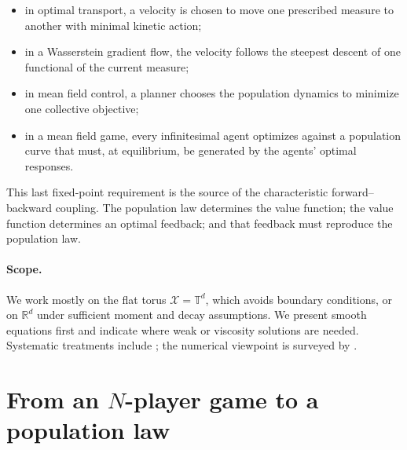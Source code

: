 \documentclass[11pt,a4paper]{article}
\theoremstyle{definition}
\newcommand{\RR}{\mathbb R}
\begin{document}
\begin{itemize}[leftmargin=2em]
  \item in optimal transport, a velocity is chosen to move one prescribed
  measure to another with minimal kinetic action;
  \item in a Wasserstein gradient flow, the velocity follows the steepest
  descent of one functional of the current measure;
  \item in mean field control, a planner chooses the population dynamics to
  minimize one collective objective;
  \item in a mean field game, every infinitesimal agent optimizes against a
  population curve that must, at equilibrium, be generated by the agents'
  optimal responses.
\end{itemize}

This last fixed-point requirement is the source of the characteristic
forward--backward coupling.  The population law determines the value function;
the value function determines an optimal feedback; and that feedback must
reproduce the population law.

\paragraph{Scope.}
We work mostly on the flat torus $\mathcal X=\mathbb T^d$, which avoids
boundary conditions, or on $\RR^d$ under sufficient moment and decay
assumptions.  We present smooth equations first and indicate where weak or
viscosity solutions are needed.  Systematic treatments include
\citet{CardaliaguetNotes2010,BensoussanFrehseYam2013,
CarmonaDelarue2018a,CarmonaDelarue2018b,CardaliaguetDelarueLasryLions2019};
the numerical viewpoint is surveyed by \citet{AchdouLauriere2020}.

\section{From an \texorpdfstring{$N$}{N}-player game to a population law}
\end{document}
